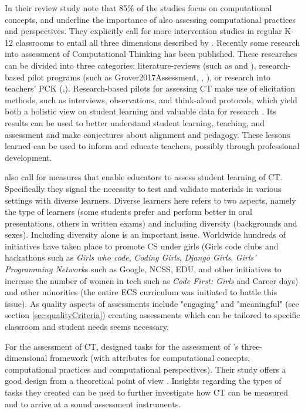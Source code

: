 In their review study  note that 85\% of the studies focus on computational concepts, and underline the importance of also assessing computational practices and perspectives. They explicitly call for more intervention studies in regular K-12 classrooms to entail all three dimensions described by . Recently some research into assessment of Computational Thinking has been published. These researches can be divided into three categories: literature-reviews (such as \cite{GroverPea2013} and \cite{crick2017}), research-based pilot programs (such as Grover2017Assessment, \cite{snow2017CTECD}, \cite{atmatzidou2016CTrobots}), or research into teachers' PCK (\cite{Yadav2017CTteacherEd},\cite{Yadav2016}). Research-based pilots for assessing CT make use of elicitation methods, such as interviews, observations, and think-aloud protocols, which yield both a holistic view on student learning and valuable data for research \cite{grover2017measuring}. Its results can be used to better understand student learning, teaching, and assessment and make conjectures about alignment and pedagogy. These lessons learned can be used to inform and educate teachers, possibly through professional development.

 also call for measures that enable educators to assess student learning of CT. Specifically they signal the necessity to test and validate materials in various settings with diverse learners. Diverse learners here refers to two aspects, namely the type of learners (some students prefer and perform better in oral presentations, others in written exams) and including diversity (backgrounds and sexes). Including diversity alone is an important issue. Worldwide hundreds of initiatives have taken place to promote CS under girls (Girls code clubs and hackathons such as \emph{Girls who code}, \emph{Coding Girls}, \emph{Django Girls}, \emph{Girls' Programming Network}s such as Google, NCSS, EDU, and other initiatives to increase the number of women in tech such as \emph{Code First: Girls} and Career days) and other minorities (the entire ECS curriculum was initiated to battle this issue). As quality aspects of assessments include "engaging" and "meaningful" (see section \ref{sec:qualityCriteria}) creating assessments which can be tailored to specific classroom and student needs seems necessary.




For the assessment of CT,  designed tasks for the assessment of 's three-dimensional framework (with attributes for computational concepts, computational practices and computational perspectives). Their study offers a good design from a theoretical point of view \cite{voogt2017effecten}. Insights regarding the types of tasks they created can be used to further investigate how CT can be measured and to arrive at a sound assessment instruments.


